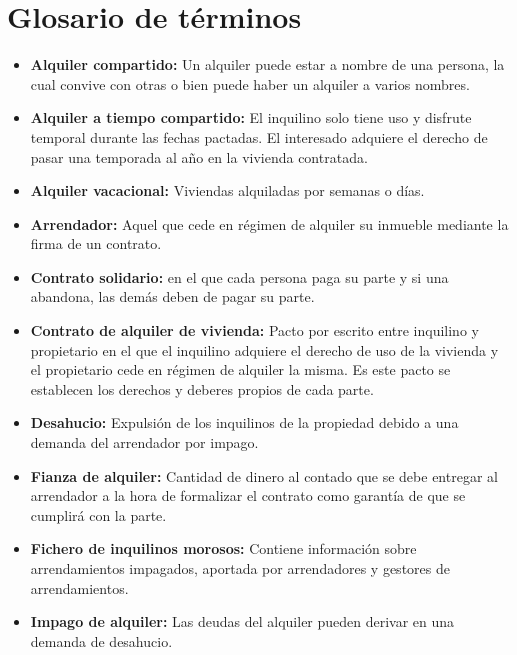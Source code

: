 \chapter{Glosario de términos}

\begin{itemize}

\item \textbf{Alquiler compartido:} Un alquiler puede estar a nombre de una persona, la cual convive con otras o bien puede haber un alquiler a varios nombres. 

\item \textbf{Alquiler a tiempo compartido:} El inquilino solo tiene uso y disfrute temporal durante las fechas pactadas. El interesado adquiere el derecho de pasar una temporada al año en la vivienda contratada.

\item \textbf{Alquiler vacacional:}
Viviendas alquiladas por semanas o días.

\item \textbf{Arrendador:} Aquel que cede en régimen de alquiler su inmueble mediante la firma de un contrato. 

\item \textbf{Contrato solidario:} en el que cada persona paga su parte y si una abandona, las demás deben de pagar su parte.

\item \textbf{Contrato de alquiler de vivienda:} Pacto por escrito entre inquilino y propietario en el que el inquilino adquiere el derecho de uso de la vivienda y el propietario cede en régimen de alquiler la misma. Es este pacto se establecen los derechos y deberes propios de cada parte.

\item \textbf{Desahucio:} Expulsión de los inquilinos de la propiedad debido a una demanda del arrendador por impago.

\item \textbf{Fianza de alquiler:} Cantidad de dinero al contado que se debe entregar al arrendador a la hora de formalizar el contrato como garantía de que se cumplirá con la parte.

\item \textbf{Fichero de inquilinos morosos:} Contiene información sobre arrendamientos impagados, aportada por arrendadores y gestores de arrendamientos.

\item \textbf{Impago de alquiler:} Las deudas del alquiler pueden derivar en una demanda de desahucio.


\end{itemize}

